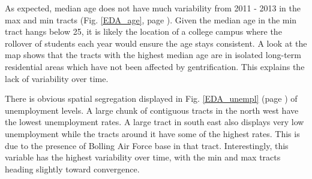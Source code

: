 \documentclass [a4paper,12 pt]{article}
\begin{document}
As expected, median age does not have much variability from 2011 - 2013 in the max and min tracts (Fig. \ref{EDA_age}, page \pageref{EDA_age}). Given the median age in the min tract hangs below 25, it is likely the location of a college campus where the rollover of students each year would ensure the age stays consistent. A look at the map shows that the tracts with the highest median age are in isolated long-term residential areas which have not been affected by gentrification. This explains the lack of variability over time.




There is obvious spatial segregation displayed in Fig. \ref{EDA_unempl} (page \pageref{EDA_unempl}) of unemployment levels. A large chunk of contiguous tracts in the north west have the lowest unemployment rates. A large tract in south east also displays very low unemployment while the tracts around it have some of the highest rates. This is due to the presence of Bolling Air Force base in that tract. Interestingly, this variable has the highest variability over time, with the min and max tracts heading slightly toward convergence.
\end{document}
